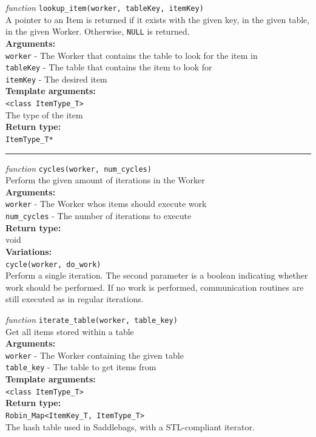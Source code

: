 \documentclass{uit-report}
\begin{document}
\textit{function} \texttt{lookup\_item(worker, tableKey, itemKey)}\\
\phantom{11111} A pointer to an Item is returned if it exists with the given key, in the given table, in the given Worker. Otherwise, \texttt{NULL} is returned.\\
\textbf{Arguments:}\\
\phantom{11111} \texttt{worker} - The Worker that contains the table to look for the item in\\
\phantom{11111} \texttt{tableKey} - The table that contains the item to look for\\
\phantom{11111} \texttt{itemKey} - The desired item\\
\textbf{Template arguments:}\\
\phantom{11111} \texttt{<class ItemType\_T>}\\
\phantom{11111}\phantom{11111} The type of the item\\
\textbf{Return type:}\\
\phantom{11111}  \texttt{ItemType\_T*}

\vskip 0.5cm
\begin{center}
	\noindent\rule{4cm}{1.2pt}
\end{center}
\vskip 0.7cm

\textit{function} \texttt{cycles(worker, num\_cycles)}\\
\phantom{11111} Perform the given amount of iterations in the Worker\\
\textbf{Arguments:}\\
\phantom{11111} \texttt{worker} - The Worker whos items should execute work\\
\phantom{11111} \texttt{num\_cycles} - The number of iterations to execute\\
\textbf{Return type:}\\
\phantom{11111}  void\\
\textbf{Variations:}\\
\phantom{11111} \texttt{cycle(worker, do\_work)}\\
\phantom{11111} \phantom{11111} Perform a single iteration. The second parameter is a boolean indicating whether work should be performed. If no work is performed, communication routines are still executed as in regular iterations.
\newpage


\textit{function} \texttt{iterate\_table(worker, table\_key)}\\
\phantom{11111} Get all items stored within a table\\
\textbf{Arguments:}\\
\phantom{11111} \texttt{worker} - The Worker containing the given table\\
\phantom{11111} \texttt{table\_key} - The table to get items from\\
\textbf{Template arguments:}\\
\phantom{11111} \texttt{<class ItemType\_T>}\\
\textbf{Return type:}\\
\phantom{11111}  \texttt{Robin\_Map<ItemKey\_T, ItemType\_T>}\\
\phantom{11111}\phantom{11111} The hash table used in Saddlebags, with a STL-compliant iterator.
\end{document}
